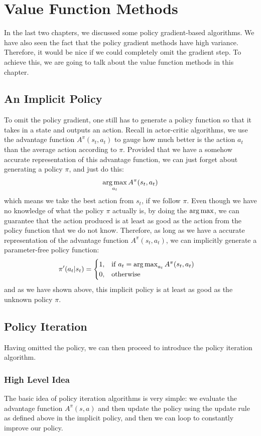 \chapter{Value Function Methods}
In the last two chapters, we discussed some policy gradient-based algorithms. We have also seen the fact that the policy gradient methods have high variance. Therefore, it would be nice if we could completely omit the gradient step. To achieve this, we are going to talk about the value function methods in this chapter. 

\section{An Implicit Policy}
To omit the policy gradient, one still has to generate a policy function so that it takes in a state and outputs an action. Recall in actor-critic algorithms, we use the advantage function $A^\pi(s_t,a_t)$ to gauge how much better is the action $a_t$ than the average action according to $\pi$. Provided that we have a somehow accurate representation of this advantage function, we can just forget about generating a policy $\pi$, and just do this:
$$\operatorname*{arg\,max}_{a_t} A^\pi(s_t,a_t)$$
which means we take the best action from $s_t$, if we follow $\pi$. Even though we have no knowledge of what the policy $\pi$ actually is, by doing the $\operatorname*{arg\,max}$, we can guarantee that the action produced is at least as good as the action from the policy function that we do not know. Therefore, as long as we have a accurate representation of the advantage function $A^\pi(s_t,a_t)$, we can implicitly generate a parameter-free policy function:
\begin{align*}
\pi'(a_t|s_t) & = \begin{cases}
                1, & \mathrm{if } \;a_t = \operatorname*{arg\,max}_{a_t}A^\pi(s_t,a_t)\\
                 0, & \mathrm{otherwise}
                    \end{cases}
\end{align*}
and as we have shown above, this implicit policy is at least as good as the unknown policy $\pi$.

\section{Policy Iteration}
Having omitted the policy, we can then proceed to introduce the policy iteration algorithm.
\subsection{High Level Idea}
The basic idea of policy iteration algorithms is very simple: we evaluate the advantage function $A^\pi(s,a)$ and then update the policy using the update rule as defined above in the implicit policy, and then we can loop to constantly improve our policy. 

